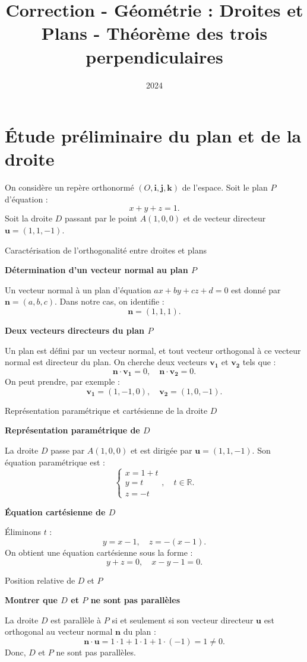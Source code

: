 \documentclass[10pt,a4paper]{article}
\title{Correction - Géométrie : Droites et Plans - Théorème des trois perpendiculaires}
\author{}
\date{2024}
\begin{document}
\section{Étude préliminaire du plan et de la droite}

On considère un repère orthonormé $(O, \mathbf{i}, \mathbf{j}, \mathbf{k})$ de l'espace. Soit le
plan $P$ d'équation :
   \[
   x + y + z = 1.
   \]
Soit la droite $D$ passant par le point $A(1, 0, 0)$ et de vecteur directeur $\mathbf{u} =
(1,1,-1)$.

\q Caractérisation de l'orthogonalité entre droites et plans
\setcounter{ql}{0}

\ql \textbf{Détermination d'un vecteur normal au plan $P$}

Un vecteur normal à un plan d'équation $ax + by + cz + d = 0$ est donné par $\mathbf{n} = (a, b,
c)$. Dans notre cas, on identifie :
\[
\mathbf{n} = (1,1,1).
\]

\ql \textbf{Deux vecteurs directeurs du plan $P$}

Un plan est défini par un vecteur normal, et tout vecteur orthogonal à ce vecteur normal est
directeur du plan. On cherche deux vecteurs $\mathbf{v_1}$ et $\mathbf{v_2}$ tels que :
\[
\mathbf{n} \cdot \mathbf{v_1} = 0, \quad \mathbf{n} \cdot \mathbf{v_2} = 0.
\]
On peut prendre, par exemple :
\[
\mathbf{v_1} = (1,-1,0), \quad \mathbf{v_2} = (1,0,-1).
\]

\q Représentation paramétrique et cartésienne de la droite $D$
\setcounter{ql}{0}

\ql \textbf{Représentation paramétrique de $D$}

La droite $D$ passe par $A(1,0,0)$ et est dirigée par $\mathbf{u} = (1,1,-1)$. Son équation
paramétrique est :
\[
\begin{cases}
x = 1 + t \\
y = t \\
z = -t
\end{cases}, \quad t \in \mathbb{R}.
\]

\ql \textbf{Équation cartésienne de $D$}

Éliminons $t$ :
\[
y = x - 1, \quad z = - (x - 1).
\]
On obtient une équation cartésienne sous la forme :
\[
y + z = 0, \quad x - y - 1 = 0.
\]

\q Position relative de $D$ et $P$
\setcounter{ql}{0}

\ql \textbf{Montrer que $D$ et $P$ ne sont pas parallèles}

La droite $D$ est parallèle à $P$ si et seulement si son vecteur directeur $\mathbf{u}$ est
orthogonal au vecteur normal $\mathbf{n}$ du plan :
\[
\mathbf{n} \cdot \mathbf{u} = 1 \cdot 1 + 1 \cdot 1 + 1 \cdot (-1) = 1 \neq 0.
\]
Donc, $D$ et $P$ ne sont pas parallèles.
\end{document}
